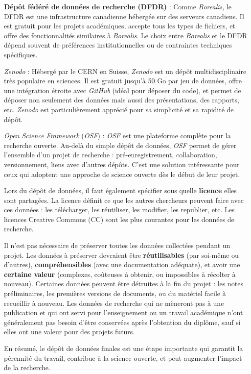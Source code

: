 \documentclass[
  letterpaper,
  DIV=11,
  numbers=noendperiod,
  oneside]{scrreprt}
\begin{document}
\textbf{Dépôt fédéré de données de recherche (DFDR)} : Comme
\emph{Borealis}, le DFDR est une infrastructure canadienne hébergée sur
des serveurs canadiens. Il est gratuit pour les projets académiques,
accepte tous les types de fichiers, et offre des fonctionnalités
similaires à \emph{Borealis}. Le choix entre \emph{Borealis} et le DFDR
dépend souvent de préférences institutionnelles ou de contraintes
techniques spécifiques.

\emph{Zenodo} : Hébergé par le CERN en Suisse, \emph{Zenodo} est un
dépôt multidisciplinaire très populaire en sciences. Il est gratuit
jusqu'à 50 Go par jeu de données, offre une intégration étroite avec
\emph{GitHub} (idéal pour déposer du code), et permet de déposer non
seulement des données mais aussi des présentations, des rapports, etc.
\emph{Zenodo} est particulièrement apprécié pour sa simplicité et sa
rapidité de dépôt.

\emph{Open Science Framework} (\emph{OSF}) : \emph{OSF} est une
plateforme complète pour la recherche ouverte. Au-delà du simple dépôt
de données, \emph{OSF} permet de gérer l'ensemble d'un projet de
recherche : pré-enregistrement, collaboration, versionnement, liens avec
d'autres dépôts. C'est une solution intéressante pour ceux qui adoptent
une approche de science ouverte dès le début de leur projet.

Lors du dépôt de données, il faut également spécifier sous quelle
\textbf{licence} elles sont partagées. La licence définit ce que les
autres chercheurs peuvent faire avec ces données : les télécharger, les
réutiliser, les modifier, les republier, etc. Les licences Creative
Commons (CC) sont les plus courantes pour les données de recherche.

Il n'est pas nécessaire de préserver toutes les données collectées
pendant un projet. Les données à préserver devraient être
\textbf{réutilisables} (par soi-même ou d'autres),
\textbf{compréhensibles} (avec une documentation adéquate), et avoir une
\textbf{certaine valeur} (complexes, coûteuses à obtenir, ou impossibles
à récolter à nouveau). Certaines données peuvent être détruites à la fin
du projet : les notes préliminaires, les premières versions de
documents, ou du matériel facile à recueillir à nouveau. Les données de
recherche qui ne mèneront pas à une publication et qui ont servi pour
l'enseignement ou un travail académique n'ont généralement pas besoin
d'être conservées après l'obtention du diplôme, sauf si elles ont une
valeur pour des projets futurs.

En résumé, le dépôt de données finales est une étape importante qui
garantit la pérennité du travail, contribue à la science ouverte, et
peut augmenter l'impact de la recherche.
\end{document}
